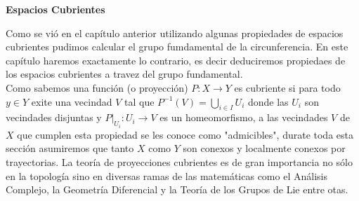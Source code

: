 \documentclass[10pt,letter,spanish]{article}
\begin{document}
\begin{center}

\large  \bf Espacios Cubrientes\\

\end{center} 

Como se vió en el capítulo anterior utilizando algunas propiedades de espacios cubrientes pudimos calcular el grupo fumdamental de la circunferencia. En este capítulo haremos exactamente lo contrario, es decir deduciremos propiedaes de los espacios cubrientes a travez del grupo fundamental.\\
Como sabemos una función (o proyección) $P:X \rightarrow Y$ es cubriente si para todo $y \in Y$ exite una vecindad $V$ tal que $P^{-1}(V)=\bigcup_{i \in I} U_i$ donde las $U_{i}$ son vecindades disjuntas y $P |_{U_{i}} :U_{i} \rightarrow V$ es un homeomorfismo, a las vecindades $V$ de $X$ que cumplen esta propiedad se les conoce como "admicibles", durate toda esta sección asumiremos que tanto $X$ como $Y$ son conexos y localmente conexos por trayectorias.
La teoría de proyecciones cubrientes es de gran importancia no sólo en la topología sino en diversas ramas de las matemáticas como el Análisis Complejo, la Geometría Diferencial y la Teoría de los Grupos de Lie entre otas.
\end{document}
